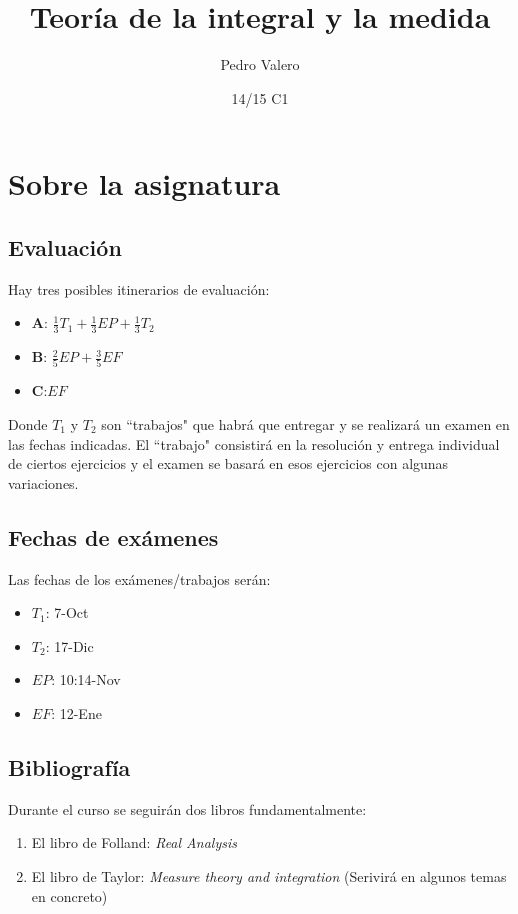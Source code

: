 \documentclass{apuntes}
\title{Teoría de la integral y la medida}
\author{Pedro Valero}
\date{14/15 C1}
\begin{document}
\pagestyle{plain}
\maketitle


\tableofcontents
\newpage

\chapter{Sobre la asignatura}
\section{Evaluación}
Hay tres posibles itinerarios de evaluación:
\begin{itemize}
\item \textbf{A}: $\frac{1}{3}T_1+\frac{1}{3}EP+\frac{1}{3}T_2$
\item \textbf{B}: $\frac{2}{5}EP+ \frac{3}{5}EF$
\item \textbf{C}:$EF$
\end{itemize}
Donde $T_1$  y $T_2$ son ``trabajos" que habrá que entregar y se realizará un examen en las fechas indicadas. El ``trabajo" consistirá en la resolución y entrega individual de ciertos ejercicios y el examen se basará en esos ejercicios con algunas variaciones.

\section{Fechas de exámenes}
Las fechas de los exámenes/trabajos serán:
\begin{itemize}
\item $T_1$: 7-Oct
\item $T_2$: 17-Dic
\item $EP$: 10:14-Nov
\item $EF$: 12-Ene
\end{itemize}

\section{Bibliografía}
Durante el curso se seguirán dos libros fundamentalmente:
\begin{enumerate}
\item El libro de Folland: \textit{Real Analysis}
\item El libro de Taylor: \textit{Measure theory and integration} (Serivirá en algunos temas en concreto)
\end{enumerate}
\end{document}

